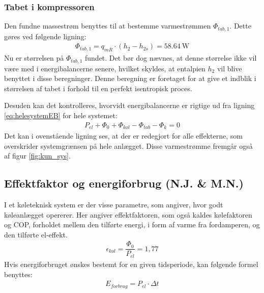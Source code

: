 \documentclass[../Hovedrapport.tex]{subfiles}
\begin{document}
\subsubsection*{Tabet i kompressoren}
Den fundne massestrøm benyttes til at bestemme varmestrømmen $\Phi_{tab,1}$. Dette gøres ved følgende ligning:
 \begin{align}
    \Phi_{tab,1}=q_{mR}\cdot (h_2-h_{2s})=\SI{58,64}{\watt}
 \end{align}
  Nu er størrelsen på $\Phi_{tab,1}$ fundet. Det bør dog nævnes, at denne størrelse ikke vil være med i energibalancerne senere, hvilket skyldes, at entalpien $h_2$ vil blive benyttet i disse beregninger. Denne beregning er foretaget for at give et indblik i størrelsen af tabet i forhold til en perfekt isentropisk proces.

Desuden kan det kontrolleres, hvorvidt energibalancerne er rigtige ud fra ligning \ref{eq:helesystemEB} for hele systemet:
\begin{align}
   P_{el} +\Phi_0 +\Phi_{\textit{køl}} - \Phi_{tab}-\Phi_k = 0
\end{align}
Det kan i ovenstående ligning ses, at der er redegjort for alle effekterne, som overskrider systemgrænsen på hele anlægget. Disse varmestrømme fremgår også af figur \ref{fig:kun_sys}.
\subsection{Effektfaktor og energiforbrug (N.J. \& M.N.)}
    \label{sec:effektfaktor_energiforbrug}
I et køleteknisk system er der visse parametre, som angiver, hvor godt køleanlægget opererer. Her angiver effektfaktoren, som også kaldes kølefaktoren og COP, forholdet mellem den tilførte energi, i form af varme fra fordamperen, og den tilførte el-effekt.
\begin{align}
\label{eq:effektfaktorulle}
    \epsilon_{\textit{køl}}= \dfrac{\Phi_0}{P_{el}} = 1,77
\end{align}
Hvis energiforbruget ønskes bestemt for en given tidsperiode, kan følgende formel benyttes:
\begin{align}
    E_{forbrug}=P_{el} \cdot \Delta t
\end{align}
\end{document}
